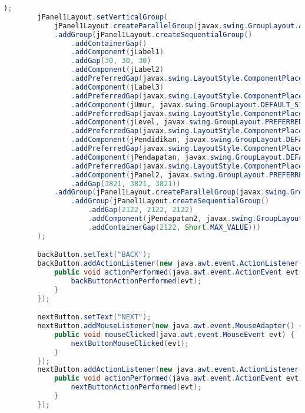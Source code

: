 \begin{lstlisting}[language=Java, caption=TampilanKondisiKetetanggaan.java]
        );
        jPanel1Layout.setVerticalGroup(
            jPanel1Layout.createParallelGroup(javax.swing.GroupLayout.Alignment.LEADING)
            .addGroup(jPanel1Layout.createSequentialGroup()
                .addContainerGap()
                .addComponent(jLabel1)
                .addGap(30, 30, 30)
                .addComponent(jLabel2)
                .addPreferredGap(javax.swing.LayoutStyle.ComponentPlacement.RELATED)
                .addComponent(jLabel3)
                .addPreferredGap(javax.swing.LayoutStyle.ComponentPlacement.UNRELATED)
                .addComponent(jUmur, javax.swing.GroupLayout.DEFAULT_SIZE, javax.swing.GroupLayout.DEFAULT_SIZE, Short.MAX_VALUE)
                .addPreferredGap(javax.swing.LayoutStyle.ComponentPlacement.UNRELATED)
                .addComponent(jLevel, javax.swing.GroupLayout.PREFERRED_SIZE, javax.swing.GroupLayout.DEFAULT_SIZE, javax.swing.GroupLayout.PREFERRED_SIZE)
                .addPreferredGap(javax.swing.LayoutStyle.ComponentPlacement.UNRELATED)
                .addComponent(jPendidikan, javax.swing.GroupLayout.DEFAULT_SIZE, javax.swing.GroupLayout.DEFAULT_SIZE, Short.MAX_VALUE)
                .addPreferredGap(javax.swing.LayoutStyle.ComponentPlacement.UNRELATED)
                .addComponent(jPendapatan, javax.swing.GroupLayout.DEFAULT_SIZE, javax.swing.GroupLayout.DEFAULT_SIZE, Short.MAX_VALUE)
                .addPreferredGap(javax.swing.LayoutStyle.ComponentPlacement.RELATED)
                .addComponent(jPanel2, javax.swing.GroupLayout.PREFERRED_SIZE, javax.swing.GroupLayout.DEFAULT_SIZE, javax.swing.GroupLayout.PREFERRED_SIZE)
                .addGap(3821, 3821, 3821))
            .addGroup(jPanel1Layout.createParallelGroup(javax.swing.GroupLayout.Alignment.LEADING)
                .addGroup(jPanel1Layout.createSequentialGroup()
                    .addGap(2122, 2122, 2122)
                    .addComponent(jPendapatan2, javax.swing.GroupLayout.PREFERRED_SIZE, javax.swing.GroupLayout.DEFAULT_SIZE, javax.swing.GroupLayout.PREFERRED_SIZE)
                    .addContainerGap(2122, Short.MAX_VALUE)))
        );

        backButton.setText("BACK");
        backButton.addActionListener(new java.awt.event.ActionListener() {
            public void actionPerformed(java.awt.event.ActionEvent evt) {
                backButtonActionPerformed(evt);
            }
        });

        nextButton.setText("NEXT");
        nextButton.addMouseListener(new java.awt.event.MouseAdapter() {
            public void mouseClicked(java.awt.event.MouseEvent evt) {
                nextButtonMouseClicked(evt);
            }
        });
        nextButton.addActionListener(new java.awt.event.ActionListener() {
            public void actionPerformed(java.awt.event.ActionEvent evt) {
                nextButtonActionPerformed(evt);
            }
        });


\end{lstlisting}

